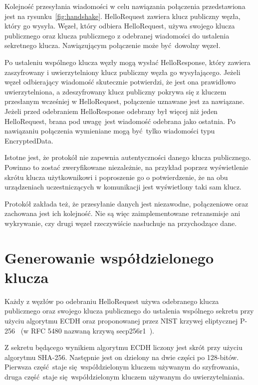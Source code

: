 Kolejność przesyłania wiadomości w celu nawiązania połączenia przedstawiona jest na rysunku~\ref{fig:handshake}. HelloRequest zawiera klucz publiczny węzła, który go wysyła. Węzeł, który odbiera HelloRequest, używa swojego klucza publicznego oraz klucza publicznego z odebranej wiadomości do ustalenia sekretnego klucza. Nawiązującym połączenie może być dowolny węzeł.

Po ustaleniu wspólnego klucza węzły mogą wysłać HelloResponse, który zawiera zaszyfrowany i uwierzytelniony klucz publiczny węzła go wysyłającego. Jeżeli węzeł odbierający wiadomość skutecznie potwierdzi, że jest ona prawidłowo uwierzytelniona, a zdeszyfrowany klucz publiczny pokrywa się z kluczem przesłanym wcześniej w HelloRequest, połączenie uznawane jest za nawiązane. Jeżeli przed odebraniem HelloResponse odebrany był więcej niż jeden HelloRequest, brana pod uwagę jest wiadomość odebrana jako ostatnia. Po nawiązaniu połączenia wymieniane mogą być tylko wiadomości typu EncryptedData.

Istotne jest, że protokół nie zapewnia autentyczności danego klucza publicznego. Powinno to zostać zweryfikowane niezależnie, na przykład poprzez wyświetlenie skrótu klucza użytkownikowi i poproszenie go o potwierdzenie, że na obu urządzeniach uczestniczących w komunikacji jest wyświetlony taki sam klucz.

Protokół zakłada też, że przesyłanie danych jest niezawodne, połączeniowe oraz zachowana jest ich kolejność. Nie są więc zaimplementowane retransmisje ani wykrywanie, czy drugi węzeł rzeczywiście nasłuchuje na przychodzące dane.

\section{Generowanie współdzielonego klucza}
\label{sec:sharedkey}

Każdy z węzłów po odebraniu HelloRequest używa odebranego klucza publicznego oraz swojego klucza publicznego do ustalenia wspólnego sekretu przy użyciu algorytmu ECDH oraz proponowanej przez NIST krzywej eliptycznej P-256~\cite{kerry2013digital} (w RFC 5480 nazwaną krzywą secp256r1~\cite{turner2009elliptic}).

Z sekretu będącego wynikiem algorytmu ECDH liczony jest skrót przy użyciu algorytmu SHA-256. Następnie jest on dzielony na dwie części po 128-bitów. Pierwsza część staje się współdzielonym kluczem używanym do szyfrowania, druga część staje się współdzielonym kluczem używanym do uwierzytelniania.

